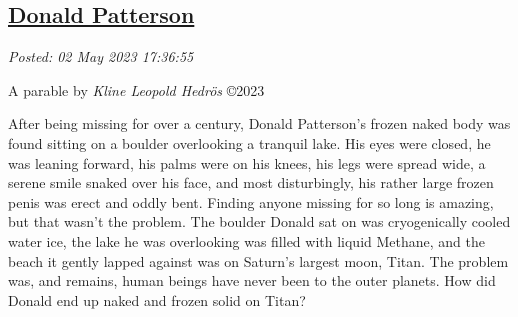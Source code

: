 %

%
%
%

\subsection*{\href{http://analyzethedatanotthedrivel.org/2023/05/02/donald-patterson/}{Donald Patterson}}


\noindent\emph{Posted: 02 May 2023 17:36:55}
\vspace{6pt}

A parable by \emph{Kline Leopold Hedrös} ©2023

After being missing for over a century, Donald Patterson's frozen naked
body was found sitting on a boulder overlooking a tranquil lake. His
eyes were closed, he was leaning forward, his palms were on his knees,
his legs were spread wide, a serene smile snaked over his face, and most
disturbingly, his rather large frozen penis was erect and oddly bent.
Finding anyone missing for so long is amazing, but that wasn't the
problem. The boulder Donald sat on was cryogenically cooled water ice,
the lake he was overlooking was filled with liquid Methane, and the
beach it gently lapped against was on Saturn's largest moon, Titan. The
problem was, and remains, human beings have never been to the outer
planets. How did Donald end up naked and frozen solid on Titan?

